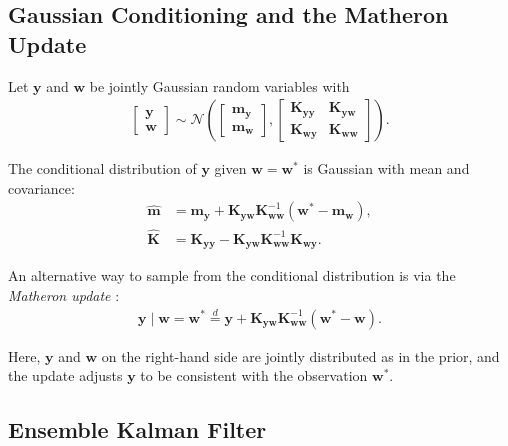 \documentclass{article}
\theoremstyle{plain}
\begin{document}
\subsection{Gaussian Conditioning and the Matheron Update}

Let $\mathbf{y}$ and $\mathbf{w}$ be jointly Gaussian random variables with
\begin{align}
\begin{bmatrix} \mathbf{y} \\ \mathbf{w} \end{bmatrix} \sim \mathcal{N} \left( \begin{bmatrix} \mathbf{m}_{\mathbf{y}} \\ \mathbf{m}_{\mathbf{w}} \end{bmatrix}, \begin{bmatrix} \mathbf{K}_{\mathbf{y}\mathbf{y}} & \mathbf{K}_{\mathbf{y}\mathbf{w}} \\ \mathbf{K}_{\mathbf{w}\mathbf{y}} & \mathbf{K}_{\mathbf{w}\mathbf{w}} \end{bmatrix} \right).
\end{align}

The conditional distribution of $\mathbf{y}$ given $\mathbf{w} = \mathbf{w}^\ast$ is Gaussian with mean and covariance:
\begin{align}
\hat{\mathbf{m}} &= \mathbf{m}_{\mathbf{y}} + \mathbf{K}_{\mathbf{y}\mathbf{w}} \mathbf{K}_{\mathbf{w}\mathbf{w}}^{-1} (\mathbf{w}^\ast - \mathbf{m}_{\mathbf{w}}), \label{eq:cond_mean} \\
\hat{\mathbf{K}} &= \mathbf{K}_{\mathbf{y}\mathbf{y}} - \mathbf{K}_{\mathbf{y}\mathbf{w}} \mathbf{K}_{\mathbf{w}\mathbf{w}}^{-1} \mathbf{K}_{\mathbf{w}\mathbf{y}}. \label{eq:cond_cov}
\end{align}

An alternative way to sample from the conditional distribution is via the \emph{Matheron update} \cite{DoucetNote2010}:
\begin{align}
\mathbf{y} \mid \mathbf{w} = \mathbf{w}^\ast \stackrel{d}{=} \mathbf{y} + \mathbf{K}_{\mathbf{y}\mathbf{w}} \mathbf{K}_{\mathbf{w}\mathbf{w}}^{-1} (\mathbf{w}^\ast - \mathbf{w}). \label{eq:matheron_update}
\end{align}

Here, $\mathbf{y}$ and $\mathbf{w}$ on the right-hand side are jointly distributed as in the prior, and the update adjusts $\mathbf{y}$ to be consistent with the observation $\mathbf{w}^\ast$.

\subsection{Ensemble Kalman Filter}
\end{document}
